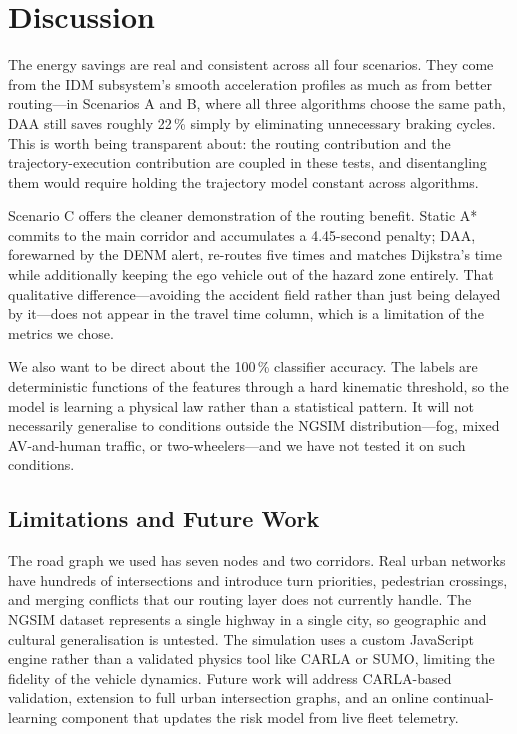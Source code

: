\documentclass[conference]{IEEEtran}
\begin{document}
\section{Discussion}
\label{sec:discussion}

The energy savings are real and consistent across all four scenarios. They
come from the IDM subsystem's smooth acceleration profiles as much as from
better routing---in Scenarios A and B, where all three algorithms choose the
same path, DAA still saves roughly 22\,\% simply by eliminating unnecessary
braking cycles. This is worth being transparent about: the routing
contribution and the trajectory-execution contribution are coupled in these
tests, and disentangling them would require holding the trajectory model
constant across algorithms.

Scenario C offers the cleaner demonstration of the routing benefit. Static
A* commits to the main corridor and accumulates a 4.45-second penalty;
DAA, forewarned by the DENM alert, re-routes five times and matches
Dijkstra's time while additionally keeping the ego vehicle out of the
hazard zone entirely. That qualitative difference---avoiding the accident
field rather than just being delayed by it---does not appear in the travel
time column, which is a limitation of the metrics we chose.

We also want to be direct about the 100\,\% classifier accuracy. The labels
are deterministic functions of the features through a hard kinematic
threshold, so the model is learning a physical law rather than a statistical
pattern. It will not necessarily generalise to conditions outside the NGSIM
distribution---fog, mixed AV-and-human traffic, or two-wheelers---and we
have not tested it on such conditions.

\subsection{Limitations and Future Work}

The road graph we used has seven nodes and two corridors. Real urban
networks have hundreds of intersections and introduce turn priorities,
pedestrian crossings, and merging conflicts that our routing layer does
not currently handle. The NGSIM dataset represents a single highway in a
single city, so geographic and cultural generalisation is untested. The
simulation uses a custom JavaScript engine rather than a validated physics
tool like CARLA or SUMO, limiting the fidelity of the vehicle dynamics.
Future work will address CARLA-based validation, extension to full urban
intersection graphs, and an online continual-learning component that
updates the risk model from live fleet telemetry.
\end{document}
